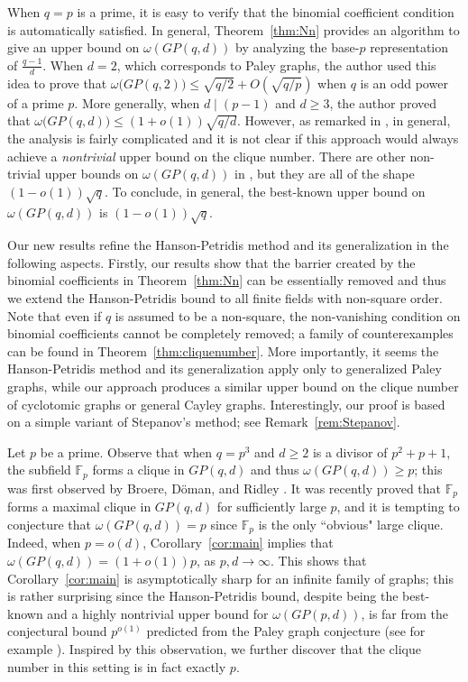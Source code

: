 \documentclass[12pt,reqno]{amsart}
\theoremstyle{definition}
\newcommand{\F}{\mathbb{F}}
\begin{document}
When $q=p$ is a prime, it is easy to verify that the binomial coefficient condition is automatically satisfied. In general, Theorem~\ref{thm:Nn} provides an algorithm to give an upper bound on $\omega(GP(q,d))$ by analyzing the base-$p$ representation of $\frac{q-1}{d}$. When $d=2$, which corresponds to Paley graphs, the author \cite{Yip1} used this idea to prove that $\omega\big(GP(q,2)\big)\leq \sqrt{q/2}+O(\sqrt{q/p})$ when $q$ is an odd power of a prime $p$. More generally, when $d \mid (p-1)$ and $d \geq 3$, the author \cite[Section 5.2]{Yip2} proved that $\omega\big(GP(q,d)\big)\leq (1+o(1))\sqrt{q/d}$. However, as remarked in \cite[Section 5.2]{Yip2}, in general, the analysis is fairly complicated and it is not clear if this approach would always achieve a \emph{nontrivial} upper bound on the clique number. There are other non-trivial upper bounds on $\omega(GP(q,d))$ in \cite{Yip2}, but they are all of the shape $(1-o(1))\sqrt{q}$. To conclude, in general, the best-known upper bound on $\omega(GP(q,d))$ is $(1-o(1))\sqrt{q}$.

Our new results refine the Hanson-Petridis method and its generalization in the following aspects. Firstly, our results show that the barrier created by the binomial coefficients in Theorem~\ref{thm:Nn} can be essentially removed and thus we extend the Hanson-Petridis bound to all finite fields with non-square order. Note that even if $q$ is assumed to be a non-square, the non-vanishing condition on binomial coefficients cannot be completely removed; a family of counterexamples can be found in Theorem~\ref{thm:cliquenumber}. More importantly, it seems the Hanson-Petridis method and its generalization apply only to generalized Paley graphs, while our approach produces a similar upper bound on the clique number of cyclotomic graphs or general Cayley graphs. Interestingly, our proof is based on a simple variant of Stepanov's method; see Remark~\ref{rem:Stepanov}.

Let $p$ be a prime. Observe that when $q=p^3$ and $d \geq 2$ is a divisor of $p^2+p+1$, the subfield $\F_p$ forms a clique in $GP(q,d)$ and thus $\omega(GP(q,d))\geq p$; this was first observed by Broere, D\"{o}man, and Ridley \cite{BDR88}. It was recently proved that $\F_p$ forms a maximal clique in $GP(q,d)$ \cite{Y23} for sufficiently large $p$, and it is tempting to conjecture that $\omega(GP(q,d))=p$ since $\F_p$ is the only ``obvious" large clique. Indeed, when $p=o(d)$, Corollary~\ref{cor:main} implies that $\omega(GP(q,d))=(1+o(1))p$, as $p,d \to \infty$. This shows that Corollary~\ref{cor:main} is asymptotically sharp for an infinite family of graphs; this is rather surprising since the 
Hanson-Petridis bound, despite being the best-known and a highly nontrivial upper bound for $\omega(GP(p,d))$, is far from the conjectural bound $p^{o(1)}$ predicted from the Paley graph conjecture (see for example \cite[Section 2.2]{Yip4}). Inspired by this observation, we further discover that the clique number in this setting is in fact exactly $p$. 
\end{document}
